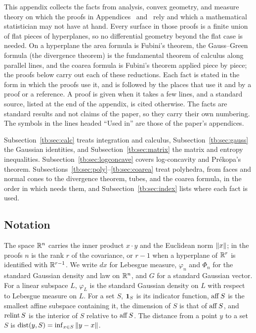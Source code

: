 This appendix collects the facts from analysis, convex geometry, and
measure theory on which the proofs in Appendices~
and~ rely and which a mathematical statistician may
not have at hand. Every surface in those proofs is a finite union of flat
pieces of hyperplanes, so no differential geometry beyond the flat case is
needed. On a hyperplane the area formula is Fubini's theorem, the
Gauss--Green formula (the divergence theorem) is the fundamental theorem of
calculus along parallel lines, and the coarea formula is Fubini's theorem
applied piece by piece; the proofs below carry out each of these
reductions. Each fact is stated in the form in which
the proofs use it, and is followed by the places that use it and by a proof
or a reference. A proof is given when it takes a few lines, and a standard
source, listed at the end of the appendix, is cited otherwise. The facts are
standard results and not claims of the paper, so they carry their own
numbering. The symbols in the lines headed ``Used in'' are those of the
paper's appendices.

Subsection~\ref{tb:sec:calc} treats integration and calculus,
Subsection~\ref{tb:sec:gauss} the Gaussian identities, and
Subsection~\ref{tb:sec:matrix} the matrix and entropy inequalities.
Subsection~\ref{tb:sec:logconcave} covers log-concavity and
Pr\'ekopa's theorem. Subsections~\ref{tb:sec:poly}--\ref{tb:sec:coarea}
treat polyhedra, from faces and normal cones to the divergence theorem,
tubes, and the coarea formula, in the order in which
 needs them, and
Subsection~\ref{tb:sec:index} lists where each fact is used.

\subsection{Notation}\label{tb:sec:notation}

The space \(\mathbb R^n\) carries the inner product \(x\cdot y\) and the Euclidean
norm \(\left\lVert x\right\rVert\); in the proofs \(n\) is the rank \(r\) of the covariance,
or \(r-1\) when a hyperplane of \(\mathbb R^r\) is identified with
\(\mathbb R^{r-1}\). We write \(dx\) for Lebesgue measure, \(\varphi_n\) and
\(\Phi_n\) for the standard Gaussian density and law on \(\mathbb R^n\), and \(G\)
for a standard Gaussian vector. For a linear subspace \(L\), \(\varphi_L\)
is the standard Gaussian density on \(L\) with respect to Lebesgue measure
on \(L\). For a set \(S\), \(\mathbf 1_S\) is its indicator function, \(\operatorname{aff} S\)
is the smallest affine subspace containing it, the dimension of \(S\) is
that of \(\operatorname{aff} S\), and \(\operatorname{relint} S\) is the interior of \(S\) relative to
\(\operatorname{aff} S\). The distance from a point \(y\) to a set \(S\) is
\(\operatorname{dist}(y,S)=\inf_{x\in S}\left\lVert y-x\right\rVert\).

